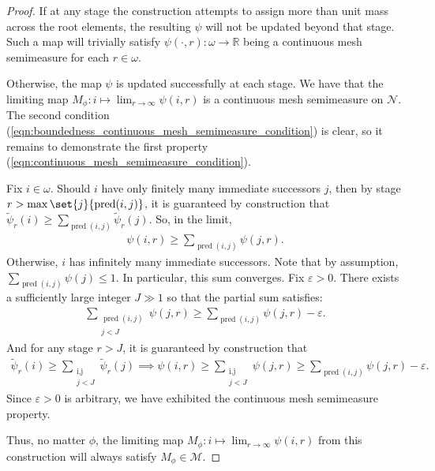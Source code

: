 \begin{proof}
    If at any stage the construction attempts to assign more than unit mass across the root elements, the resulting $\psi$ will not be updated beyond that stage. Such a map will trivially satisfy $\psi(\cdot, r) : \omega \to \mathbb{R}$ being a continuous mesh semimeasure for each $r \in \omega$. 

    Otherwise, the map $\psi$ is updated successfully at each stage. We have that the limiting map $M_\phi : i \mapsto \lim_{r \to \infty} \psi(i, r)$ is a continuous mesh semimeasure on $\mathcal{N}$. The second condition (\ref{eqn:boundedness_continuous_mesh_semimeasure_condition}) is clear, so it remains to demonstrate the first property (\ref{eqn:continuous_mesh_semimeasure_condition}).  
    
    Fix $i \in \omega$. Should $i$ have only finitely many immediate successors $j$, then by stage $r > \max\set{j}{\operatorname{pred}(i, j)}$, it is guaranteed by construction that $\widetilde{\psi}_r(i) \geq \sum_{\operatorname{pred}(i,j)} \widetilde{\psi}_r(j)$. So, in the limit,
    \begin{align*}
        \psi(i, r) \geq \sum_{\operatorname{pred}(i, j)} \psi(j, r).  
    \end{align*}
    Otherwise, $i$ has infinitely many immediate successors. Note that by assumption, $\sum_{\operatorname{pred}(i, j)} \psi(j) \leq 1$. In particular, this sum converges. Fix $\varepsilon > 0$. There exists a sufficiently large integer $J \gg 1$ so that the partial sum satisfies:
    \begin{align*}
        \sum_{\substack{\operatorname{pred}(i, j) \\ j < J}} \psi(j, r) \geq \sum_{\operatorname{pred}(i, j)} \psi(j, r) - \varepsilon.
    \end{align*}
    And for any stage $r > J$, it is guaranteed by construction that 
    \begin{align*}
        \widetilde{\psi}_r(i) \geq \sum_{\substack{\operatorname{i, j} \\ j < J}} \widetilde{\psi}_r(j) \implies \psi(i, r) \geq \sum_{\substack{\operatorname{i, j} \\ j < J}} \psi(j, r) \geq \sum_{\operatorname{pred}(i, j)} \psi(j, r) - \varepsilon.
    \end{align*}
    Since $\varepsilon > 0$ is arbitrary, we have exhibited the continuous mesh semimeasure property.

    Thus, no matter $\phi$, the limiting map $M_\phi : i \mapsto \lim_{r \to \infty} \psi(i, r)$ from this construction will always satisfy $M_\phi \in \mathcal{M}$. 
    

\end{proof}
